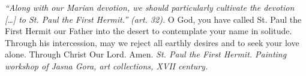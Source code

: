 \pagestyle{empty}
\hspace{0pt}
\vfill

\textit{``Along with our Marian devotion, we should particularly cultivate the devotion [\ldots] to St. Paul the First Hermit.'' (art. 32). }
\medbreak
O God, you have called St. Paul the First Hermit our 
Father into the desert to contemplate your name in solitude. Through
his intercession, may we reject all earthly desires and to seek your
love alone. Through Christ Our Lord. Amen.
\vfill
\textit{St. Paul the First Hermit. Painting workshop of Jasna Gora, art
collections, XVII century.}
\hspace{0pt}
\newpage
